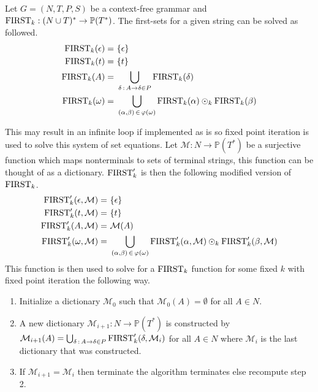 \begin{algorithm}
    \label{algorithm:first}
    Let $G = (N, T, P, S)$ be a context-free grammar and $\text{FIRST}_k: (N \cup T)^* \to \mathbb{P}(T^*)$. The first-sets for a given string can be solved as followed.
    \begin{align*}
        \text{FIRST}_k(\epsilon) =&\,\, \{\epsilon\} \\
        \text{FIRST}_k(t) =&\,\, \{t\} \\
        \text{FIRST}_k(A) =&\,\, \bigcup_{\delta \, : \, A \to \delta \in P} \text{FIRST}_k(\delta) \\
        \text{FIRST}_k(\omega) =&\,\, \bigcup_{(\alpha, \beta) \, \in \, \varphi(\omega)} \text{FIRST}_k(\alpha) \odot_k \text{FIRST}_k(\beta)
    \end{align*}
\end{algorithm}
\noindent This may result in an infinite loop if implemented as is so fixed point iteration is used to solve this system of set equations. Let $\mathcal{M}: N \to \mathbb{P}(T^*)$ be a surjective function which maps nonterminals to sets of terminal strings, this function can be thought of as a dictionary. $\text{FIRST}'_k$ is then the following modified version of $\text{FIRST}_k$.
\begin{align*}
    \text{FIRST}'_k(\epsilon, \mathcal{M}) =&\,\, \{\epsilon\} \\
    \text{FIRST}'_k(t, \mathcal{M}) =&\,\, \{t\} \\
    \text{FIRST}'_k(A, \mathcal{M}) =&\,\, \mathcal{M}(A) \\
    \text{FIRST}'_k(\omega, \mathcal{M}) =&\,\, \bigcup_{(\alpha, \beta) \, \in \, \varphi(\omega)} \text{FIRST}'_k(\alpha, \mathcal{M}) \odot_k \text{FIRST}'_k(\beta, \mathcal{M})
\end{align*}
This function is then used to solve for a $\text{FIRST}_k$ function for some fixed $k$ with fixed point iteration the following way.
\begin{enumerate}
    \item Initialize a dictionary $\mathcal{M}_0$ such that $\mathcal{M}_0(A) = \emptyset$ for all $A \in N$.
    \item A new dictionary $\mathcal{M}_{i+1}: N \to \mathbb{P}(T^*)$ is constructed by $\mathcal{M}_{i+1}(A) = \bigcup_{\delta \, : \, A \to \delta \in P} \text{FIRST}'_k(\delta, \mathcal{M}_{i})$ for all $A \in N$ where $\mathcal{M}_{i}$ is the last dictionary that was constructed.
    \item If $\mathcal{M}_{i + 1} = \mathcal{M}_{i}$ then terminate the algorithm terminates else recompute step 2.
\end{enumerate}
